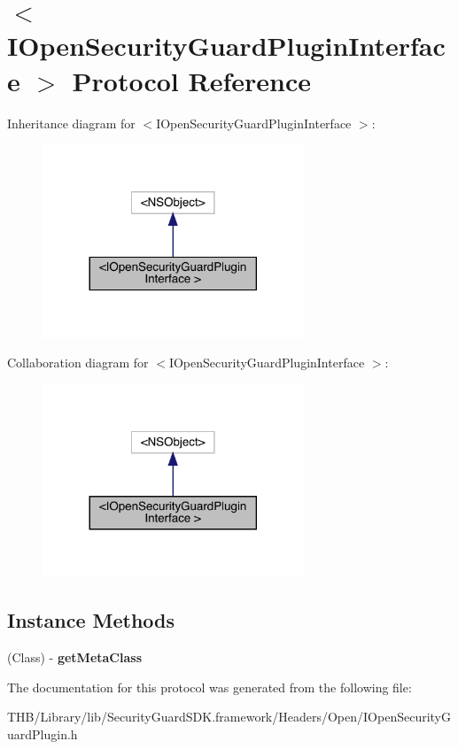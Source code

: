 \hypertarget{protocol_i_open_security_guard_plugin_interface_01-p}{}\section{$<$I\+Open\+Security\+Guard\+Plugin\+Interface $>$ Protocol Reference}
\label{protocol_i_open_security_guard_plugin_interface_01-p}


Inheritance diagram for $<$I\+Open\+Security\+Guard\+Plugin\+Interface $>$\+:\nopagebreak
\begin{figure}[H]
\begin{center}
\leavevmode
\includegraphics[width=221pt]{protocol_i_open_security_guard_plugin_interface_01-p__inherit__graph}
\end{center}
\end{figure}


Collaboration diagram for $<$I\+Open\+Security\+Guard\+Plugin\+Interface $>$\+:\nopagebreak
\begin{figure}[H]
\begin{center}
\leavevmode
\includegraphics[width=221pt]{protocol_i_open_security_guard_plugin_interface_01-p__coll__graph}
\end{center}
\end{figure}
\subsection*{Instance Methods}
\begin{DoxyCompactItemize}
\item 
\mbox{\label{protocol_i_open_security_guard_plugin_interface_01-p_afb194649242b84fbbf1d46d03e4603ce}} 
(Class) -\/ {\bfseries get\+Meta\+Class}
\end{DoxyCompactItemize}


The documentation for this protocol was generated from the following file\+:\begin{DoxyCompactItemize}
\item 
T\+H\+B/\+Library/lib/\+Security\+Guard\+S\+D\+K.\+framework/\+Headers/\+Open/I\+Open\+Security\+Guard\+Plugin.\+h\end{DoxyCompactItemize}
